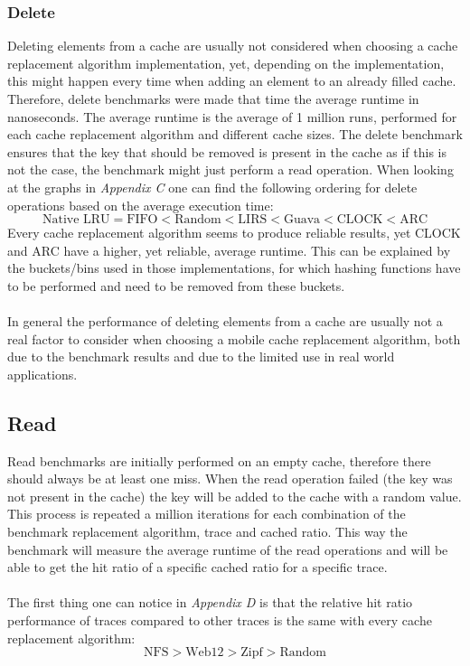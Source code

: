 \documentclass[pdftex,a4paper,12pt,twoside]{report}
\begin{document}
\subsubsection{Delete} Deleting elements from a cache are usually not considered when choosing a cache replacement algorithm implementation, yet, depending on the implementation, this might happen every time when adding an element to an already filled cache. Therefore, delete benchmarks were made that time the average runtime in nanoseconds.
The average runtime is the average of 1 million runs, performed for each cache replacement algorithm and different cache sizes. The delete benchmark ensures that the key that should be removed is present in the cache as if this is not the case, the benchmark might just perform a read operation.
When looking at the graphs in \emph{Appendix C} one can find the following ordering for delete operations based on the average execution time:
\[
\text{Native LRU} = \text{FIFO} < \text{Random} < \text{LIRS} < \text{Guava} < \text{CLOCK} < \text{ARC} 
\]
Every cache replacement algorithm seems to produce reliable results, yet CLOCK and ARC have a higher, yet reliable, average runtime. This can be explained by the buckets/bins used in those implementations, for which hashing functions have to be performed and need to be removed from these buckets.
\\\\
In general the performance of deleting elements from a cache are usually not a real factor to consider when choosing a mobile cache replacement algorithm, both due to the benchmark results and due to the limited use in real world applications.
\subsection{Read}
Read benchmarks are initially performed on an empty cache, therefore there should always be at least one miss. When the read operation failed (the key was not present in the cache) the key will be added to the cache with a random value. This process is repeated a million iterations for each combination of the benchmark replacement algorithm, trace and cached ratio. This way the benchmark will measure the average runtime of the read operations and will be able to get the hit ratio of a specific cached ratio for a specific trace.
\\\\
The first thing one can notice in \emph{Appendix D} is that the relative hit ratio performance of traces compared to other traces is the same with every cache replacement algorithm:
\[
\text{NFS} > \text{Web12} > \text{Zipf} > \text{Random}
\]
\end{document}
